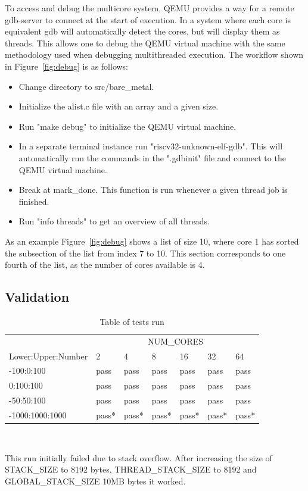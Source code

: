 To access and debug the multicore system, QEMU provides a way for a remote
gdb-server to connect at the start of execution.\cite{QEMU} In a system where
each core is equivalent gdb will automatically detect the cores, but will
display them as threads. This allows one to debug the QEMU virtual machine with
the same methodology used when debugging multithreaded execution. The workflow shown in Figure~\ref{fig:debug} is as follows:
\begin{itemize}
  \item Change directory to src/bare\_metal.
  \item Initialize the alist.c file with an array and a given size.
  \item Run "make debug" to initialize the QEMU virtual machine.
  \item In a separate terminal instance run "riscv32-unknown-elf-gdb". This will
    automatically run the commands in the ".gdbinit" file and connect to the
    QEMU virtual machine.
  \item Break at mark\_done. This function is run whenever a given thread job is
    finished.
  \item Run "info threads" to get an overview of all threads.
\end{itemize}
As an example Figure~\ref{fig:debug} shows a list of size 10, where core 1 has
sorted the subsection of the list from index 7 to 10. This section corresponds
to one fourth of the list, as the number of cores available is 4.

\subsection{Validation}\label{sec:validate}
\begin{table}
  \caption{Table of tests run}\label{tab:tests}
  \begin{center}
    \begin{tabular}[c]{l|l|l|l|l|l|l}
      & \multicolumn{6}{c}{NUM\_CORES}\\
      \cline{2-7}
      Lower:Upper:Number & 2 & 4 & 8 & 16 & 32 & 64\\
      \hline
      -100:0:100 & pass & pass & pass & pass & pass & pass \\
      \hline
      0:100:100 & pass & pass & pass & pass & pass & pass\\
      \hline
      -50:50:100 & pass & pass & pass & pass & pass & pass \\
      \hline
      -1000:1000:1000 & pass* & pass* & pass* & pass* & pass* & pass*
    \end{tabular} \\
    \vspace{1em}
    \raggedright{\footnotesize *This run initially failed due to stack overflow. After
    increasing the size of STACK\_SIZE to 8192 bytes, THREAD\_STACK\_SIZE to
  8192 and GLOBAL\_STACK\_SIZE 10MB bytes it worked.} \\
  \end{center}
\end{table}


